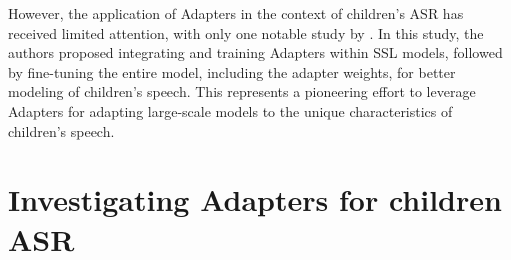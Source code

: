 However, the application of Adapters in the context of children's ASR has received limited attention, with only one notable study by \cite{fan2022draft}. In this study, the authors proposed integrating and training Adapters within SSL models, followed by fine-tuning the entire model, including the adapter weights, for better modeling of children's speech. This represents a pioneering effort to leverage Adapters for adapting large-scale models to the unique characteristics of children's speech.

\section{Investigating Adapters for children ASR}


